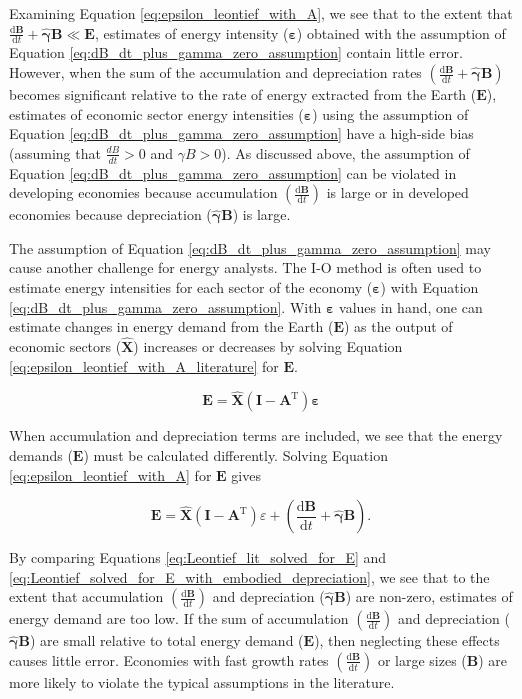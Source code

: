 \documentclass[authoryear,preprint,review,12pt]{elsarticle}
\let\oldhat\hat
\renewcommand{\vec}[1]{\mathbf{#1}}
\renewcommand{\hat}[1]{\oldhat{\mathbf{#1}}}
\begin{document}
Examining Equation \ref{eq:epsilon_leontief_with_A}, we see that to the extent that $\frac{\mathrm{d}\vec{B}}{\mathrm{d}t} + \hat{\vec{\gamma}}\vec{B} \ll \vec{E}$, estimates of energy intensity ($\vec{\varepsilon}$) obtained with the assumption of Equation \ref{eq:dB_dt_plus_gamma_zero_assumption} contain little error. However, when the sum of the accumulation and depreciation rates $\left(\frac{\mathrm{d}\vec{B}}{\mathrm{d}t} + \hat{\vec{\gamma}}\vec{B}\right)$ becomes significant relative to the rate of energy extracted from the Earth ($\vec{E}$), estimates of economic sector energy intensities ($\vec{\varepsilon}$) using the assumption of Equation \ref{eq:dB_dt_plus_gamma_zero_assumption} have a high-side bias (assuming that $\frac{dB}{dt} >0$ and $\gamma B > 0$). As discussed above, the assumption of Equation \ref{eq:dB_dt_plus_gamma_zero_assumption} can be violated in developing economies because accumulation $\left(\frac{\mathrm{d}\vec{B}}{\mathrm{d}t}\right)$ is large or in developed economies because depreciation ($\hat{\gamma}\vec{B}$) is large. 

The assumption of Equation \ref{eq:dB_dt_plus_gamma_zero_assumption} may cause another challenge for energy analysts. The I-O method is often used to estimate energy intensities for each sector of the economy ($\vec{\varepsilon}$) with Equation \ref{eq:dB_dt_plus_gamma_zero_assumption}. With $\vec{\varepsilon}$ values in hand, one can estimate changes in energy demand from the Earth ($\vec{E}$) as the output of economic sectors ($\hat{\vec{X}}$) increases or decreases by solving Equation \ref{eq:epsilon_leontief_with_A_literature} for $\vec{E}$.

\begin{equation} \label{eq:Leontief_lit_solved_for_E}
	\vec{E} = \hat{\vec{X}}(\vec{I} - \vec{A}^{\mathrm{T}})\vec{\varepsilon}
\end{equation}

When accumulation and depreciation terms are included, we see that the energy demands ($\vec{E}$) must be calculated differently. Solving Equation \ref{eq:epsilon_leontief_with_A} for $\vec{E}$ gives 

\begin{equation} \label{eq:Leontief_solved_for_E_with_embodied_depreciation}
	\vec{E} = \hat{\vec{X}}(\vec{I} - \vec{A}^{\mathrm{T}})\varepsilon + \left(\frac{\mathrm{d}\vec{B}}{\mathrm{d}t} + \hat{\gamma}\vec{B}\right).
\end{equation}

\noindent By comparing Equations \ref{eq:Leontief_lit_solved_for_E} and \ref{eq:Leontief_solved_for_E_with_embodied_depreciation}, we see that to the extent that accumulation $\left(\frac{\mathrm{d}\vec{B}}{\mathrm{d}t}\right)$ and depreciation ($\hat{\vec{\gamma}}\vec{B}$) are non-zero, estimates of energy demand are too low. If the sum of accumulation $\left(\frac{\mathrm{d}\vec{B}}{\mathrm{d}t}\right)$ and depreciation ($\hat{\vec{\gamma}}\vec{B}$) are small relative to total energy demand ($\vec{E}$), then neglecting these effects causes little error. Economies with fast growth rates $\left(\frac{\mathrm{d}\vec{B}}{\mathrm{d}t}\right)$ or large sizes ($\vec{B}$) are more likely to violate the typical assumptions in the literature.
\end{document}

